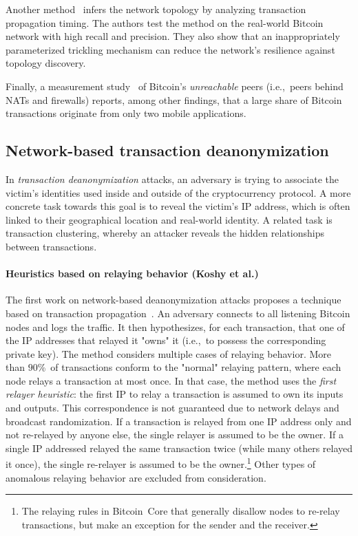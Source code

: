 Another method~\cite{Neudecker2016} infers the network topology by analyzing transaction propagation timing.
The authors test the method on the real-world Bitcoin network with high recall and precision.
They also show that an inappropriately parameterized trickling mechanism can reduce the network's resilience against topology discovery.

Finally, a measurement study~\cite{Wang2017} of Bitcoin's \textit{unreachable} peers (i.e.,~peers behind NATs and firewalls) reports, among other findings, that a large share of Bitcoin transactions originate from only two mobile applications.


\subsection{Network-based transaction deanonymization}
\label{sec:network-analysis}

In \textit{transaction deanonymization} attacks, an adversary is trying to associate the victim's identities used inside and outside of the cryptocurrency protocol.
A more concrete task towards this goal is to reveal the victim's IP address, which is often linked to their geographical location and real-world identity.
A related task is transaction clustering, whereby an attacker reveals the hidden relationships between transactions.

\paragraph{Heuristics based on relaying behavior (Koshy et al.)}

The first work on network-based deanonymization attacks proposes a technique based on transaction propagation~\cite{Koshy2014}.
An adversary connects to all listening Bitcoin nodes and logs the traffic.
It then hypothesizes, for each transaction, that one of the IP addresses that relayed it "owns" it (i.e.,~to possess the corresponding private key).
The method considers multiple cases of relaying behavior.
More than $90$\%~of transactions conform to the "normal" relaying pattern, where each node relays a transaction at most once.
In that case, the method uses the \textit{first relayer heuristic}: the first IP to relay a transaction is assumed to own its inputs and outputs.
This correspondence is not guaranteed due to network delays and broadcast randomization.
If a transaction is relayed from one IP address only and not re-relayed by anyone else, the single relayer is assumed to be the owner.
If a single IP addressed relayed the same transaction twice (while many others relayed it once), the single re-relayer is assumed to be the owner.\footnote{The relaying rules in Bitcoin~Core that generally disallow nodes to re-relay transactions, but make an exception for the sender and the receiver.}
Other types of anomalous relaying behavior are excluded from consideration.


